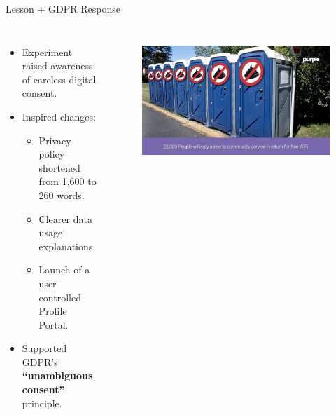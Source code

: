\begin{frame}{Lesson + GDPR Response}
\begin{columns}[c]
    \begin{itemize}
    \item Experiment raised awareness of careless digital consent.
    \item Inspired changes:
    \begin{itemize}
        \item Privacy policy shortened from 1,600 to 260 words.
        \item Clearer data usage explanations.
        \item Launch of a user-controlled Profile Portal.
    \end{itemize}
    \item Supported GDPR’s \textbf{“unambiguous consent”} principle\cite{TOILET}.
\end{itemize}

    \centering
    \begin{figure}
        \centering
        \includegraphics[width=\textwidth]{images/toilet.png}
        \label{fig:toilet}
    \end{figure}    
\end{columns}
\end{frame}


